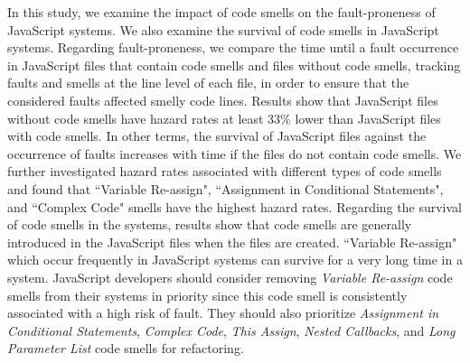 \documentclass[smallcondensed]{svjour3}
\begin{document}
In this study, we examine the impact of code smells on the fault-proneness of JavaScript systems. We also examine the survival of code smells in JavaScript systems. Regarding fault-proneness, we compare the time until a fault occurrence in JavaScript files that contain code smells and files without code smells, tracking faults and smells at the line level {\color{blue}of each file, in order to ensure that the considered faults affected smelly code lines.}  %
Results show that JavaScript files without code smells have hazard rates at least 33\% lower than JavaScript files with code smells. %
In other terms, the survival of JavaScript files against the occurrence of faults increases with time if the files do not contain code smells. We further investigated hazard rates associated with different types of code smells and found that ``Variable Re-assign", ``Assignment in Conditional Statements", and ``Complex Code" smells have the highest hazard rates. Regarding the survival of code smells in the systems, results show that code smells are generally introduced in the JavaScript files when the files are created. ``Variable Re-assign" which occur frequently in JavaScript systems can survive for a very long time in a system. JavaScript developers should consider removing \emph{Variable Re-assign} code smells from their systems in priority since this code smell is consistently associated with a high risk of fault. They should also prioritize \emph{Assignment in Conditional Statements}, \emph{Complex Code}, \emph{This Assign}, \emph{Nested Callbacks}, and \emph{Long Parameter List} code smells for refactoring.
\end{document}
